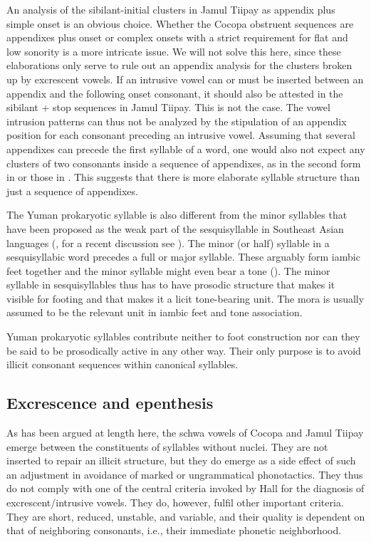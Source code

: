 \documentclass[output=paper,colorlinks,citecolor=brown]{langscibook}
\begin{document}
An analysis of the sibilant-initial clusters in Jamul Tiipay as appendix plus simple onset is an obvious choice. Whether the Cocopa obstruent sequences are appendixes plus onset or complex onsets with a strict requirement for flat and low sonority is a more intricate issue. We will not solve this here, since these elaborations only serve to rule out an appendix analysis for the clusters broken up by excrescent vowels. If an intrusive vowel can or must be inserted between an appendix and the following onset consonant, it should also be attested in the sibilant + stop sequences in Jamul Tiipay. This is not the case. The vowel intrusion patterns can thus not be analyzed by the stipulation of an appendix position for each consonant preceding an intrusive vowel. Assuming that several appendixes can precede the first syllable of a word, one would also not expect any clusters of two consonants inside a sequence of appendixes, as in the second form in  or those in . This suggests that there is more elaborate syllable structure than just a sequence of appendixes.  

The Yuman prokaryotic syllable is also different from the minor syllables that have been proposed as the weak part of the sesquisyllable in Southeast Asian languages (\citealt{Matisoff1973,Shaw1994}, for a recent discussion see \citealt{Butler2014}). The minor (or half) syllable in a sesquisyllabic word precedes a full or major syllable. These arguably form iambic feet together and the minor syllable might even bear a tone (\citealt{SvantessonKarlsson2004,Butler2014}). The minor syllable in sesquisyllables thus has to have prosodic structure that makes it visible for footing and that makes it a licit tone-bearing unit. The mora is usually assumed to be the relevant unit in iambic feet and tone association.

Yuman prokaryotic syllables contribute neither to foot construction nor can they be said to be prosodically active in any other way. Their only purpose is to avoid illicit consonant sequences within canonical syllables.

\subsection{ Excrescence and epenthesis}
\largerpage
As has been argued at length here, the schwa vowels of Cocopa and Jamul Tiipay emerge between the constituents of syllables without nuclei. They are not inserted to repair an illicit structure, but they do emerge as a side effect of such an adjustment in avoidance of marked or ungrammatical phonotactics. They thus do not comply with one of the central criteria invoked by Hall for the diagnosis of excrescent/intrusive vowels. They do, however, fulfil other important criteria. They are short, reduced, unstable, and variable, and their quality is dependent on that of neighboring consonants, i.e., their immediate phonetic neighborhood. 
\end{document}
